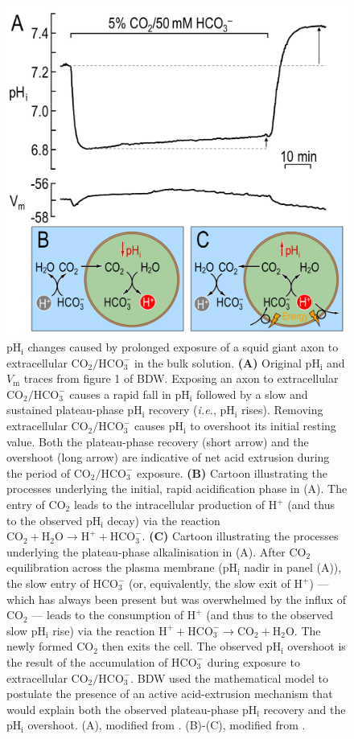 \documentclass[fleqn,10pt]{physiome}
\begin{document}
\begin{figure}[ht]
\centering
\includegraphics[width=0.49\linewidth]{img/Figure 1.png}
\caption{\label{fig:1} $\mathrm{pH_i}$ changes caused by prolonged exposure of a squid giant axon to extracellular $\mathrm{CO_2}/\mathrm{HCO_3^-}$ in the bulk solution. \textbf{(A)} Original $\mathrm{pH_i}$ and $V_\mathrm{m}$ traces from figure 1 of BDW. Exposing an axon to extracellular $\mathrm{CO_2}/\mathrm{HCO_3^-}$ causes a rapid fall in $\mathrm{pH_i}$ followed by a slow and sustained plateau-phase $\mathrm{pH_i}$ recovery (\emph{i.e.}, $\mathrm{pH_i}$ rises). Removing extracellular $\mathrm{CO_2}/\mathrm{HCO_3^-}$ causes $\mathrm{pH_i}$ to overshoot its initial resting value. Both the plateau-phase recovery (short arrow) and the overshoot (long arrow) are indicative of net acid extrusion during the period of $\mathrm{CO_2}/\mathrm{HCO_3^-}$ exposure. \textbf{(B)} Cartoon illustrating the processes underlying the initial, rapid acidification phase in (A). The entry of $\mathrm{CO_2}$ leads to the intracellular production of $\mathrm{H^+}$ (and thus to the observed $\mathrm{pH_i}$ decay) via the reaction $\mathrm{CO_2}+\mathrm{H_2O} \longrightarrow \mathrm{H^+}+\mathrm{HCO^-_3}$. \textbf{(C)} Cartoon illustrating the processes underlying the plateau-phase alkalinisation in (A). After $\mathrm{CO_2}$ equilibration across the plasma membrane ($\mathrm{pH_i}$ nadir in panel (A)), the slow entry of $\mathrm{HCO_3^-}$ (or, equivalently, the slow exit of $\mathrm{H^+}$) --- which has always been present but was overwhelmed by the influx of $\mathrm{CO_2}$ --- leads to the consumption of $\mathrm{H^+}$ (and thus to the observed slow $\mathrm{pH_i}$ rise) via the reaction $\mathrm{H^+}+\mathrm{HCO^-_3} \longrightarrow \mathrm{CO_2}+\mathrm{H_2O}$. The newly formed $\mathrm{CO_2}$ then exits the cell. The observed $\mathrm{pH_i}$ overshoot is the result of the accumulation of $\mathrm{HCO_3^-}$ during exposure to extracellular $\mathrm{CO_2}/\mathrm{HCO_3^-}$. BDW used the mathematical model to postulate the presence of an active acid-extrusion mechanism that would explain both the observed plateau-phase $\mathrm{pH_i}$ recovery and the $\mathrm{pH_i}$ overshoot. (A), modified from \cite{boron1976intracellular}. (B)-(C), modified from \cite{boron2010sharpey}.}
\end{figure}
\end{document}
